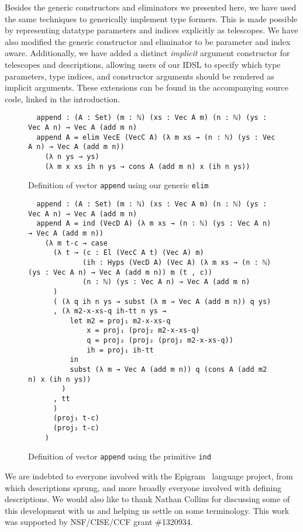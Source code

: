 \documentclass[nonatbib]{sigplanconf}
\begin{document}
Besides the generic constructors and eliminators we presented here, we
have used the same techniques to generically implement type
formers. This is made possible by representing datatype parameters and
indices explicitly as telescopes. We have also modified the generic
constructor and eliminator to be parameter and index aware. Additionally, we have added a
distinct {\it implicit} argument constructor for telescopes and
descriptions, allowing users of our IDSL to specify which type
parameters, type indices, and constructor arguments should be rendered
as implicit arguments. These extensions can be found in the
accompanying source code, linked in the introduction.

\appendix

\begin{figure*}
\caption{Definition of vector {\tt append} using our generic {\tt elim}}
\label{fig:append-elim}
\begin{verbatim}
  append : (A : Set) (m : ℕ) (xs : Vec A m) (n : ℕ) (ys : Vec A n) → Vec A (add m n)
  append A = elim VecE (VecC A) (λ m xs → (n : ℕ) (ys : Vec A n) → Vec A (add m n))
    (λ n ys → ys)
    (λ m x xs ih n ys → cons A (add m n) x (ih n ys))
\end{verbatim}
\end{figure*}

\begin{figure*}
\caption{Definition of vector {\tt append} using the primitive {\tt ind}}
\label{fig:append-ind}
\begin{verbatim}
  append : (A : Set) (m : ℕ) (xs : Vec A m) (n : ℕ) (ys : Vec A n) → Vec A (add m n) 
  append A = ind (VecD A) (λ m xs → (n : ℕ) (ys : Vec A n) → Vec A (add m n))
    (λ m t-c → case
      (λ t → (c : El (VecC A t) (Vec A) m)
             (ih : Hyps (VecD A) (Vec A) (λ m xs → (n : ℕ) (ys : Vec A n) → Vec A (add m n)) m (t , c))
             (n : ℕ) (ys : Vec A n) → Vec A (add m n)
      )
      ( (λ q ih n ys → subst (λ m → Vec A (add m n)) q ys)
      , (λ m2-x-xs-q ih-tt n ys →
          let m2 = proj₁ m2-x-xs-q
              x = proj₁ (proj₂ m2-x-xs-q)
              q = proj₂ (proj₂ (proj₂ m2-x-xs-q))
              ih = proj₁ ih-tt
          in
          subst (λ m → Vec A (add m n)) q (cons A (add m2 n) x (ih n ys))
        )
      , tt
      )
      (proj₁ t-c)
      (proj₂ t-c)
    )
\end{verbatim}
\end{figure*}

\acks

We are indebted to everyone involved with the
{\sc Epigram}~\citep{mcbride2005epigram} language project, from which
descriptions sprung, and more broadly everyone involved with defining
descriptions.
We would also like to thank Nathan Collins for discussing some of this
development with us and helping us settle on some terminology. This
work was supported by NSF/CISE/CCF grant \#1320934.



\end{document}

